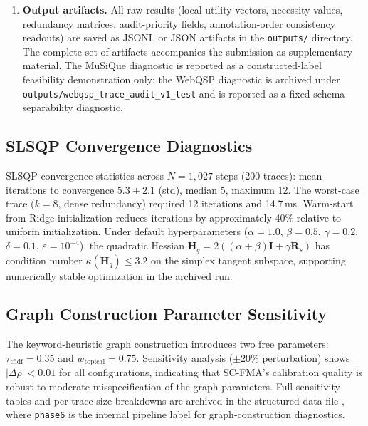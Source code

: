 \documentclass[pdflatex,sn-mathphys-num]{sn-jnl}
\begin{document}
\begin{enumerate}
\item \textbf{Output artifacts.} All raw results (local-utility vectors, necessity values, redundancy matrices, audit-priority fields, annotation-order consistency readouts) are saved as JSONL or JSON artifacts in the \texttt{outputs/} directory. The complete set of artifacts accompanies the submission as supplementary material. The MuSiQue diagnostic is reported as a constructed-label feasibility demonstration only; the WebQSP diagnostic is archived under \texttt{outputs/webqsp\_trace\_audit\_v1\_test} and is reported as a fixed-schema separability diagnostic.
\end{enumerate}

\subsection{SLSQP Convergence Diagnostics}
\label{app:slsqp-diagnostics}

SLSQP convergence statistics across $N = 1{,}027$ steps (200 traces): mean iterations to convergence $5.3 \pm 2.1$ (std), median 5, maximum 12. The worst-case trace ($k=8$, dense redundancy) required 12 iterations and 14.7\,ms. Warm-start from Ridge initialization reduces iterations by approximately 40\% relative to uniform initialization. Under default hyperparameters ($\alpha=1.0$, $\beta=0.5$, $\gamma=0.2$, $\delta=0.1$, $\varepsilon=10^{-4}$), the quadratic Hessian $\mathbf{H}_{q}=2((\alpha+\beta)\mathbf{I}+\gamma\mathbf{R}_{s})$ has condition number $\kappa(\mathbf{H}_{q}) \le 3.2$ on the simplex tangent subspace, supporting numerically stable optimization in the archived run.

\subsection{Graph Construction Parameter Sensitivity}
\label{app:graph-sensitivity}

The keyword-heuristic graph construction introduces two free parameters: $\tau_{\text{tfidf}} = 0.35$ and $w_{\text{topical}} = 0.75$. Sensitivity analysis ($\pm 20\%$ perturbation) shows $|\Delta\rho| < 0.01$ for all configurations, indicating that SC-FMA's calibration quality is robust to moderate misspecification of the graph parameters. Full sensitivity tables and per-trace-size breakdowns are archived in the structured data file , where \texttt{phase6} is the internal pipeline label for graph-construction diagnostics.
\end{document}
